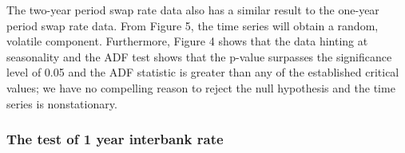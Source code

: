 \documentclass[10pt]{article}
\begin{document}



The two-year period swap rate data also has a similar result to the one-year period swap rate data. From Figure 5, the time series will obtain a random, volatile component. Furthermore, Figure 4 shows that the data hinting at seasonality and the ADF test shows that the p-value surpasses the significance level of 0.05 and the ADF statistic is greater than any of the established critical values; we have no compelling reason to reject the null hypothesis and the time series is nonstationary. 

\subsubsection{The test of 1 year interbank rate}


\end{document}
